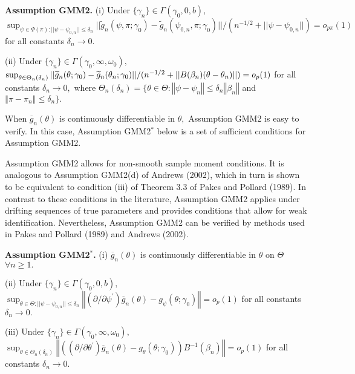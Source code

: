 \documentclass[12pt,titlepage,final,oneside,letterpaper]{article}
\begin{document}
\noindent \textbf{Assumption GMM2. }(i) Under $\{\gamma _{n}\}\in \Gamma
(\gamma _{0},0,b),$ \newline
$\sup_{\psi \in \Psi (\pi ):||\psi -\psi _{0,n}||\leq \delta _{n}}||%
\widetilde{g}_{n}(\psi ,\pi ;\gamma _{0})-\widetilde{g}_{n}(\psi _{0,n},\pi
;\gamma _{0})||/(n^{-1/2}+||\psi -\psi _{0,n}||)=o_{p\pi }(1)$ for all
constants $\delta _{n}\rightarrow 0.$

\noindent (ii) Under $\{\gamma _{n}\}\in \Gamma (\gamma _{0},\infty ,\omega
_{0}),$ $\sup_{\theta \in \Theta _{n}\left( \delta _{n}\right) }||\widetilde{%
g}_{n}(\theta ;\gamma _{0})-\widetilde{g}_{n}(\theta _{n};\gamma
_{0})||/(n^{-1/2}+||B(\beta _{n})(\theta -\theta _{n})||)=o_{p}(1)$ for all
constants $\delta _{n}\rightarrow 0,$ where $\Theta _{n}\left( \delta
_{n}\right) =\{\theta \in \Theta :\left\Vert \psi -\psi _{n}\right\Vert \leq
\delta _{n}\left\Vert \beta _{n}\right\Vert $ and $\left\Vert \pi -\pi
_{n}\right\Vert \leq \delta _{n}\}.$\medskip

When $\overline{g}_{n}\left( \theta \right) $ is continuously differentiable
in $\theta ,$ Assumption GMM2 is easy to verify. In this case, Assumption
GMM2$^{\ast }$ below is a set of sufficient conditions for Assumption GMM2.

Assumption GMM2 allows for non-smooth sample moment conditions. It is
analogous to Assumption GMM2(d) of Andrews (2002), which in turn is shown to
be equivalent to condition (iii) of Theorem 3.3 of Pakes and Pollard (1989).
In contrast to these conditions in the literature, Assumption GMM2 applies
under drifting sequences of true parameters and provides conditions that
allow for weak identification. Nevertheless, Assumption GMM2 can be verified
by methods used in Pakes and Pollard (1989) and Andrews (2002).\medskip

\noindent \textbf{Assumption GMM2}$^{\ast }$\textbf{.} (i) $\overline{g}%
_{n}(\theta )$ is continuously differentiable in $\theta $ on $\Theta $ $%
\forall n\geq 1.$

\noindent (ii) Under $\{\gamma _{n}\}\in \Gamma (\gamma _{0},0,b),$ $%
\sup_{\theta \in \Theta :||\psi -\psi _{0,n}||\leq \delta _{n}}\left\Vert
(\partial /\partial \psi ^{\prime })\overline{g}_{n}(\theta )-g_{\psi
}(\theta ;\gamma _{0})\right\Vert =o_{p}(1)$ for all constants $\delta
_{n}\rightarrow 0.$

\noindent (iii) Under $\{\gamma _{n}\}\in \Gamma (\gamma _{0},\infty ,\omega
_{0}),$ $\sup_{\theta \in \Theta _{n}\left( \delta _{n}\right) }\left\Vert
\left( (\partial /\partial \theta ^{\prime })\overline{g}_{n}(\theta
)-g_{\theta }(\theta ;\gamma _{0})\right) B^{-1}(\beta _{n})\right\Vert
=o_{p}(1)$ for all constants $\delta _{n}\rightarrow 0.$\medskip
\end{document}
